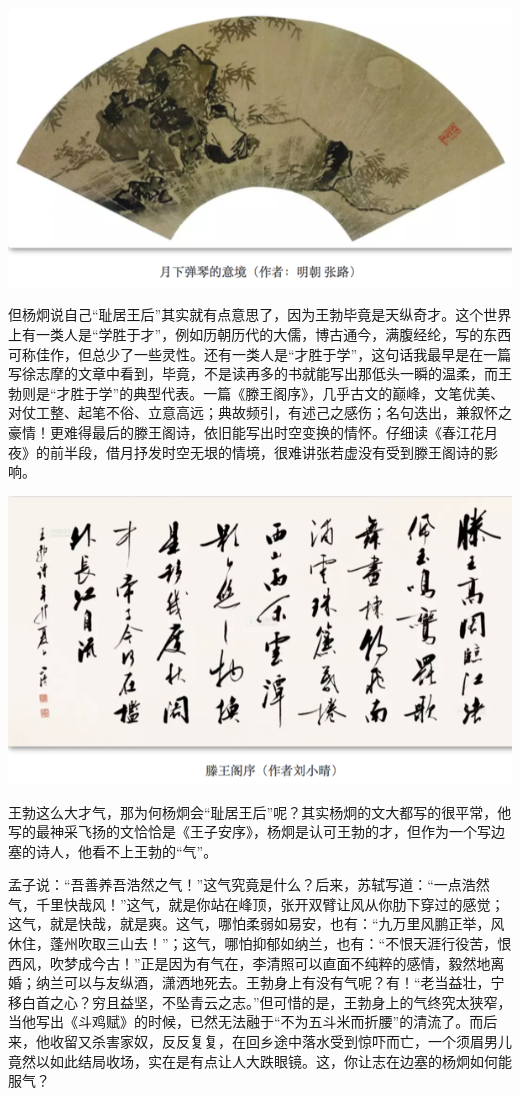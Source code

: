 \documentclass[]{book}
\begin{document}
\includegraphics[width=8.33in]{images/ctsj4}

但杨炯说自己``耻居王后''其实就有点意思了，因为王勃毕竟是天纵奇才。这个世界上有一类人是``学胜于才''，例如历朝历代的大儒，博古通今，满腹经纶，写的东西可称佳作，但总少了一些灵性。还有一类人是``才胜于学''，这句话我最早是在一篇写徐志摩的文章中看到，毕竟，不是读再多的书就能写出那低头一瞬的温柔，而王勃则是``才胜于学''的典型代表。一篇《滕王阁序》，几乎古文的巅峰，文笔优美、对仗工整、起笔不俗、立意高远；典故频引，有述己之感伤；名句迭出，兼叙怀之豪情！更难得最后的滕王阁诗，依旧能写出时空变换的情怀。仔细读《春江花月夜》的前半段，借月抒发时空无垠的情境，很难讲张若虚没有受到滕王阁诗的影响。

\includegraphics[width=8.33in]{images/ctsj5}

王勃这么大才气，那为何杨炯会``耻居王后''呢？其实杨炯的文大都写的很平常，他写的最神采飞扬的文恰恰是《王子安序》，杨炯是认可王勃的才，但作为一个写边塞的诗人，他看不上王勃的``气''。

孟子说：``吾善养吾浩然之气！''这气究竟是什么？后来，苏轼写道：``一点浩然气，千里快哉风！''这气，就是你站在峰顶，张开双臂让风从你肋下穿过的感觉；这气，就是快哉，就是爽。这气，哪怕柔弱如易安，也有：``九万里风鹏正举，风休住，蓬州吹取三山去！''；这气，哪怕抑郁如纳兰，也有：``不恨天涯行役苦，恨西风，吹梦成今古！''正是因为有气在，李清照可以直面不纯粹的感情，毅然地离婚；纳兰可以与友纵酒，潇洒地死去。王勃身上有没有气呢？有！``老当益壮，宁移白首之心？穷且益坚，不坠青云之志。''但可惜的是，王勃身上的气终究太狭窄，当他写出《斗鸡赋》的时候，已然无法融于``不为五斗米而折腰''的清流了。而后来，他收留又杀害家奴，反反复复，在回乡途中落水受到惊吓而亡，一个须眉男儿竟然以如此结局收场，实在是有点让人大跌眼镜。这，你让志在边塞的杨炯如何能服气？
\end{document}
